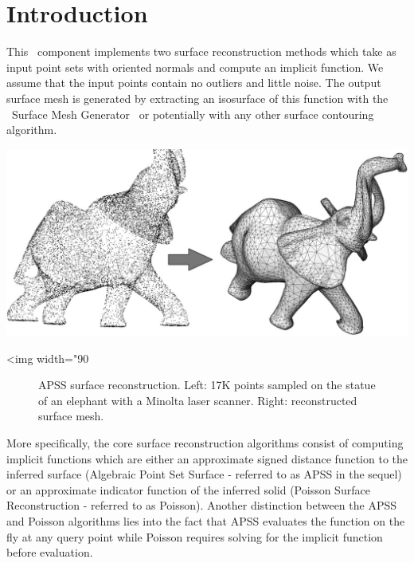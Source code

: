 \section{Introduction}

This \cgal\ component implements two surface reconstruction methods which take as input point sets with oriented normals and compute an implicit function. We assume that the input points contain no outliers and little noise. The output surface mesh is generated by extracting an isosurface of this function with the \cgal\ Surface Mesh Generator~\cite{cgal:ry-gsddrm-06} or potentially with any other surface contouring algorithm. 

\begin{center}
    \label{Surface_reconstruction_points_3-fig-introduction}
    \begin{ccTexOnly}
        \includegraphics[width=1.0\textwidth]{Surface_reconstruction_points_3/introduction} %
    \end{ccTexOnly}
    \begin{ccHtmlOnly}
        <img width="90%
    \end{ccHtmlOnly}
    \begin{figure}[h]
        \caption{APSS surface reconstruction.
                 Left: 17K points sampled on the statue of an
                 elephant with a Minolta laser scanner.
                 Right: reconstructed surface mesh.}
    \end{figure}
\end{center}

More specifically, the core surface reconstruction algorithms consist of computing implicit functions which are either an approximate signed distance function to the inferred surface (Algebraic Point Set Surface - referred to as APSS in the sequel) or an approximate indicator function of the inferred solid (Poisson Surface Reconstruction - referred to as Poisson). Another distinction between the APSS and Poisson algorithms lies into the fact that APSS evaluates the function on the fly at any query point while Poisson requires solving for the implicit function before evaluation. 


